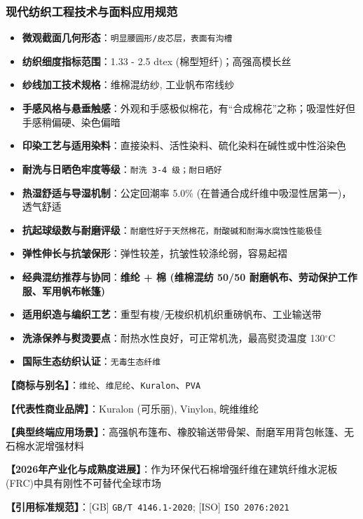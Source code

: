 \documentclass[11pt,openright,twoside,UTF8]{ctexbook}
\begin{document}
\subsubsection*{现代纺织工程技术与面料应用规范}
\begin{itemize} \setlength{\itemsep}{2pt}
    \item \textbf{微观截面几何形态}：\texttt{明显腰圆形/皮芯层，表面有沟槽}
    \item \textbf{纺织细度指标范围}：1.33 - 2.5 dtex (棉型短纤)；高强高模长丝
    \item \textbf{纱线加工技术规格}：维棉混纺纱, 工业帆布帘线纱
    \item \textbf{手感风格与悬垂触感}：外观和手感极似棉花，有“合成棉花”之称；吸湿性好但手感稍偏硬、染色偏暗
    \item \textbf{印染工艺与适用染料}：直接染料、活性染料、硫化染料在碱性或中性浴染色
    \item \textbf{耐洗与日晒色牢度等级}：\texttt{耐洗 3-4 级；耐日晒好}
    \item \textbf{热湿舒适与导湿机制}：公定回潮率 5.0\% (在普通合成纤维中吸湿性居第一)，透气舒适
    \item \textbf{抗起球级数与耐磨评级}：\texttt{耐磨性好于天然棉花，耐酸碱和耐海水腐蚀性能极佳}
    \item \textbf{弹性伸长与抗皱保形}：弹性较差，抗皱性较涤纶弱，容易起褶
    \item \textbf{经典混纺推荐与协同}：\textbf{维纶 + 棉 (维棉混纺 50/50 耐磨帆布、劳动保护工作服、军用帆布帐篷)}
    \item \textbf{适用织造与编织工艺}：重型有梭/无梭织机机织重磅帆布、工业输送带
    \item \textbf{洗涤保养与熨烫要点}：耐热水性良好，可正常机洗，最高熨烫温度 130$^\circ\mathrm{C}$
    \item \textbf{国际生态纺织认证}：\texttt{无毒生态纤维}
\end{itemize}
\vspace{0.2cm}

\noindent\textbf{【商标与别名】}：\texttt{维纶}、\texttt{维尼纶}、\texttt{Kuralon}、\texttt{PVA}\par
\noindent\textbf{【代表性商业品牌】}：Kuralon (可乐丽), Vinylon, 皖维维纶\par
\noindent\textbf{【典型终端应用场景】}：高强帆布篷布、橡胶输送带骨架、耐磨军用背包帐篷、无石棉水泥增强材料\par
\noindent\textbf{【2026年产业化与成熟度进展】}：作为环保代石棉增强纤维在建筑纤维水泥板(FRC)中具有刚性不可替代全球市场\par
\noindent\textbf{【引用标准规范】}：[GB] \texttt{GB/T 4146.1-2020}; [ISO] \texttt{ISO 2076:2021}\par
\vspace{0.5cm}
\end{document}
